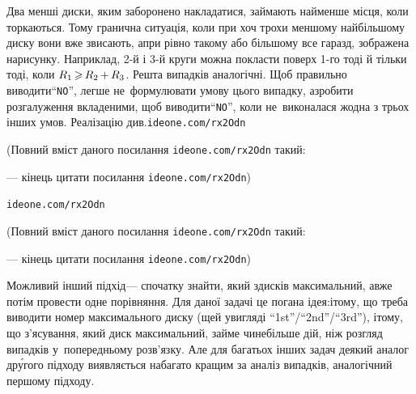 \documentclass[14pt,a4paper]{extarticle}
\def\dib#1{\,#1\discretionary{}{\mbox{$#1$}}{}\,}
\renewcommand{\baselinestretch}{1.3125}
\begin{document}
\Tutorial
Два менші диски, яким заборонено накладатися, займають найменше місця, коли торкаються. 
Тому гранична ситуація, коли при хоч трохи меншому найбільшому диску вони вже звисають, а\nolinebreak[3] при рівно такому або більшому все гаразд, зображена на\nolinebreak[2] рисунку. Наприклад, \mbox{2-й} і \mbox{3-й} круги можна покласти поверх \mbox{1-го} тоді й тільки тоді, коли $R_1\dib{{\>}}R_2\dib{{+}}R_3$. Решта випадків аналогічні.
Щоб правильно виводити\nolinebreak[3] ``\texttt{NO}'', легше не~формулювати умову цього випадку, а\nolinebreak[3] зробити розгалуження вкладеними, щоб виводити\nolinebreak[3] ``\texttt{NO}'', коли не~виконалася жодна з трьох інших умов.
Реалізацію див.\nolinebreak[2] 
\verb"ideone.com/rx2Odn"


{\color{green}\begin{small}

\renewcommand{\baselinestretch}{0.875}

(Повний вміст даного посилання \verb"ideone.com/rx2Odn" такий:

--- кінець цитати посилання \verb"ideone.com/rx2Odn")

\end{small}}



\verb"ideone.com/rx2Odn"


{\color{green}\begin{small}

\renewcommand{\baselinestretch}{0.875}

(Повний вміст даного посилання \verb"ideone.com/rx2Odn" такий:

--- кінець цитати посилання \verb"ideone.com/rx2Odn")

\end{small}}




Можливий інший підхід\nolinebreak[3] --- спочатку знайти, який з\nolinebreak[3] дисків максимальний, а\nolinebreak[3] вже потім провести одне порівняння. Для даної задачі це погана ідея:\linebreak[1] і\nolinebreak[3] тому, що треба виводити номер максимального диску (ще\nolinebreak[3] й у\nolinebreak[3] вигляді ``1st''/``2nd''/``3rd''), і\nolinebreak[3] тому, що з'ясування, який диск максимальний, займе чи\nolinebreak[3] не\nolinebreak[3] більше дій, ніж розгляд випадків у~попередньому розв'язку. Але для багатьох інших задач \mbox{деякий} аналог др\'{у}гого підходу виявляється набагато кращим за аналіз випадків, аналогічний першому підходу.
\end{document}
